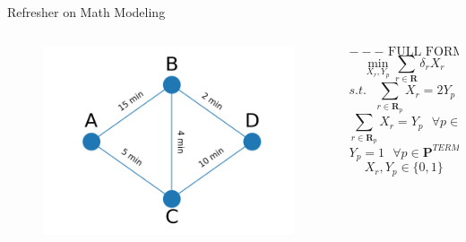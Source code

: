 \documentclass[10pt, aspectratio=169]{beamer}
\begin{document}
\begin{frame}{Refresher on Math Modeling}
    \begin{columns}
        \begin{column}{0.5\textwidth}
            \begin{figure}
                \includegraphics[width=\linewidth]{../01_Introduction/RoutePlanningProblem.png}
            \end{figure}
        \end{column}
        \begin{column}{0.5\textwidth}
            $$---\text{ FULL FORMULATION }---$$
            $$\min_{X_r,Y_p} \sum_{r \in \textbf{R}} \delta_r X_r$$
            $$s.t.\ \ \ \sum_{r \in \textbf{R}_p} X_r = 2 Y_p \ \ \ \forall p \in \textbf{P}^{NON-TERM}$$
            $$\sum_{r \in \textbf{R}_p} X_r = Y_p \ \ \ \forall p \in \textbf{P}^{TERM}$$
            $$Y_p = 1 \ \ \ \forall p \in \textbf{P}^{TERM}$$
            $$X_r, Y_p \in \{0,1\}$$
        \end{column}
    \end{columns}
\end{frame}
\end{document}

